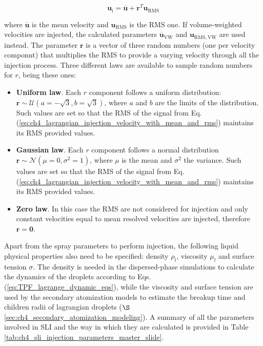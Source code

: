 \begin{itemize}
	\begin{equation}
	\label{eq:ch4_lagrangian_injection_velocity_with_mean_and_rms}
	\boldsymbol{u}_\mathrm{i} = \overline{\boldsymbol{u}} + \boldsymbol{r}^T \boldsymbol{u}_\mathrm{RMS}
	\end{equation}
	
	where $\overline{\boldsymbol{u}}$ is the mean velocity and $\boldsymbol{u}_\mathrm{RMS}$ is the RMS one. If volume-weighted velocities are injected, the calculated parameters $\overline{\boldsymbol{u}}_\mathrm{VW}$ and $\boldsymbol{u}_\mathrm{RMS,VW}$ are used instead. The parameter $\boldsymbol{r}$ is a vector of three random numbers (one per velocity componnt) that multiplies the RMS to provide a varying velocity through all the injection process. Three different laws are available to sample random numbers for $r$, being these ones:
	
	\begin{itemize}
	
	\item \textbf{Uniform law}. Each $r$ component follows a uniform distribution: $\boldsymbol{r} \sim \mathcal{U} \left( a = -\sqrt{3}, b = \sqrt{3} \right)$, where $a$ and $b$ are the limits of the distribution. Such values are set so that the RMS of the signal from Eq. (\ref{eq:ch4_lagrangian_injection_velocity_with_mean_and_rms}) maintains its RMS provided values.
	
	\item \textbf{Gaussian law}. Each $r$ component follows a normal distribution $\boldsymbol{r} \sim \mathcal{N} \left( \mu = 0, \sigma^2 = 1 \right)$, where $\mu$ is the mean and $\sigma^2$ the variance. Such values are set so that the RMS of the signal from Eq. (\ref{eq:ch4_lagrangian_injection_velocity_with_mean_and_rms}) maintains its RMS provided values.
	
	\item \textbf{Zero law}. In this case the RMS are not considered for injection and only constant velocities equal to mean resolved velocities are injected, therefore $\boldsymbol{r} = \textbf{0}$.
	
	\end{itemize}

\end{itemize}

Apart from the spray parameters to perform injection, the following liquid physical properties also need to be specified: density $\rho_l$, viscosity $\mu_l$ and surface tension $\sigma$. The density is needed in the dispersed-phase simulations to calculate the dynamics of the droplets according to Eqs. (\ref{eq:TPF_lagrange_dynamic_eqs}), while the viscosity and surface tension are used by the secondary atomization models to estimate the breakup time and children radii of lagrangian droplets ($\S$\ref{sec:ch4_secondary_atomization_modeling}). A summary of all the parameters involved in SLI and the way in which they are calculated is provided in Table \ref{tab:ch4_sli_injection_parameters_master_slide}.




